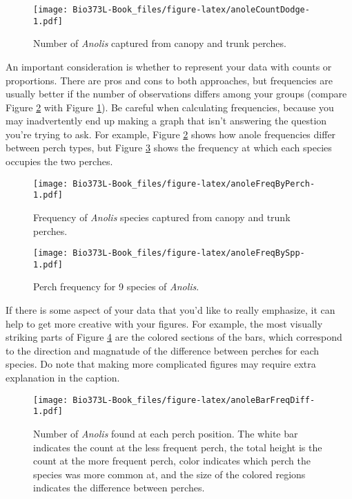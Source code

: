 \documentclass[]{book}
\begin{document}
\begin{figure}
\centering
\texttt{[image: Bio373L-Book\_files/figure-latex/anoleCountDodge-1.pdf]}
\caption{\label{fig:anoleCountDodge}Number of \emph{Anolis} captured from canopy and
trunk perches.}
\end{figure}

An important consideration is whether to represent your data with counts
or proportions. There are pros and cons to both approaches, but
frequencies are usually better if the number of observations differs
among your groups (compare Figure \ref{fig:anoleFreqByPerch} with Figure
\ref{fig:anoleCountDodge}). Be careful when calculating frequencies,
because you may inadvertently end up making a graph that isn't answering
the question you're trying to ask. For example, Figure
\ref{fig:anoleFreqByPerch} shows how anole frequencies differ between
perch types, but Figure \ref{fig:anoleFreqBySpp} shows the frequency at
which each species occupies the two perches.




\begin{figure}
\centering
\texttt{[image: Bio373L-Book\_files/figure-latex/anoleFreqByPerch-1.pdf]}
\caption{\label{fig:anoleFreqByPerch}Frequency of \emph{Anolis} species captured from
canopy and trunk perches.}
\end{figure}



\begin{figure}
\centering
\texttt{[image: Bio373L-Book\_files/figure-latex/anoleFreqBySpp-1.pdf]}
\caption{\label{fig:anoleFreqBySpp}Perch frequency for 9 species of \emph{Anolis}.}
\end{figure}

If there is some aspect of your data that you'd like to really
emphasize, it can help to get more creative with your figures. For
example, the most visually striking parts of Figure
\ref{fig:anoleBarFreqDiff} are the colored sections of the bars, which
correspond to the direction and magnatude of the difference between
perches for each species. Do note that making more complicated figures
may require extra explanation in the caption.







\begin{figure}
\centering
\texttt{[image: Bio373L-Book\_files/figure-latex/anoleBarFreqDiff-1.pdf]}
\caption{\label{fig:anoleBarFreqDiff}Number of \emph{Anolis} found at each perch position.
The white bar indicates the count at the less frequent perch, the total
height is the count at the more frequent perch, color indicates which
perch the species was more common at, and the size of the colored
regions indicates the difference between perches.}
\end{figure}
\end{document}
